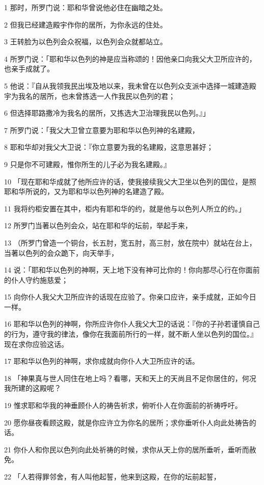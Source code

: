 \par 1 那时，所罗门说：耶和华曾说他必住在幽暗之处。
\par 2 但我已经建造殿宇作你的居所，为你永远的住处。
\par 3 王转脸为以色列会众祝福，以色列会众就都站立。
\par 4 所罗门说：「耶和华以色列的神是应当称颂的！因他亲口向我父大卫所应许的，也亲手成就了。
\par 5 他说：『自从我领我民出埃及地以来，我未曾在以色列众支派中选择一城建造殿宇为我名的居所，也未曾拣选一人作我民以色列的君；
\par 6 但选择耶路撒冷为我名的居所，又拣选大卫治理我民以色列。』」
\par 7 所罗门说：「我父大卫曾立意要为耶和华以色列神的名建殿，
\par 8 耶和华却对我父大卫说：『你立意要为我的名建殿，这意思甚好；
\par 9 只是你不可建殿，惟你所生的儿子必为我名建殿。』
\par 10 「现在耶和华成就了他所应许的话，使我接续我父大卫坐以色列的国位，是照耶和华所说的，又为耶和华以色列神的名建造了殿。
\par 11 我将约柜安置在其中，柜内有耶和华的约，就是他与以色列人所立的约。」
\par 12 所罗门当著以色列会众，站在耶和华的坛前，举起手来，
\par 13 （所罗门曾造一个铜台，长五肘，宽五肘，高三肘，放在院中）就站在台上，当著以色列的会众跪下，向天举手，
\par 14 说：「耶和华以色列的神啊，天上地下没有神可比你的！你向那尽心行在你面前的仆人守约施慈爱；
\par 15 向你仆人我父大卫所应许的话现在应验了。你亲口应许，亲手成就，正如今日一样。
\par 16 耶和华以色列的神啊，你所应许你仆人我父大卫的话说：『你的子孙若谨慎自己的行为，遵守我的律法，像你在我面前所行的一样，就不断人坐以色列的国位。』现在求你应验这话。
\par 17 耶和华以色列的神啊，求你成就向你仆人大卫所应许的话。
\par 18 「神果真与世人同住在地上吗？看哪，天和天上的天尚且不足你居住的，何况我所建的这殿呢？
\par 19 惟求耶和华我的神垂顾仆人的祷告祈求，俯听仆人在你面前的祈祷呼吁。
\par 20 愿你昼夜看顾这殿，就是你应许立为你名的居所；求你垂听仆人向此处祷告的话。
\par 21 你仆人和你民以色列向此处祈祷的时候，求你从天上你的居所垂听，垂听而赦免。
\par 22 「人若得罪邻舍，有人叫他起誓，他来到这殿，在你的坛前起誓，
